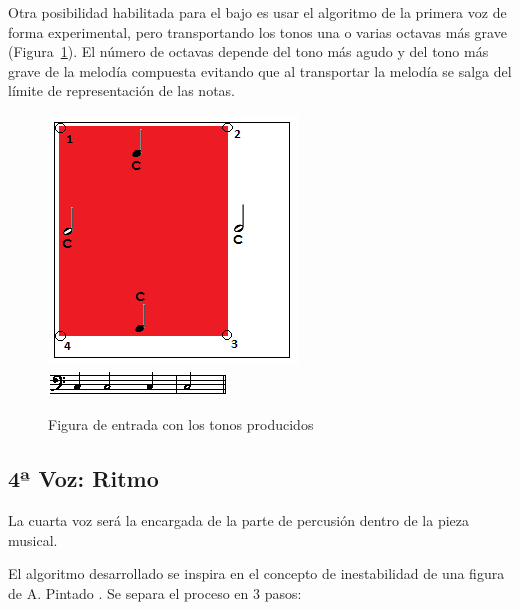 Otra posibilidad habilitada para el bajo es usar el algoritmo de la primera voz de forma experimental, pero transportando los tonos una o varias octavas más grave (Figura~\ref{fig:Figura2Voz3}). El número de octavas depende del tono más agudo y del tono más grave de la melodía compuesta evitando que al transportar la melodía se salga del límite de representación de las notas.

		\begin{figure}[!htbp]
		\centering
		\hspace*{0.0in}
		\includegraphics[scale=1]{graphics/simpletest2-F2F3_2.png}
		\includegraphics[scale=1]{graphics/simpletest3_2-BASSpartitura.png}
		\caption{Figura de entrada con los tonos producidos}
		\label{fig:Figura2Voz3}
		\end{figure}


\subsection{4ª Voz: Ritmo}

La cuarta voz será la encargada de la parte de percusión dentro de la pieza musical.

El algoritmo desarrollado se inspira en el concepto de inestabilidad de una figura de A. Pintado \cite{portutesis}. Se separa el proceso en 3 pasos:


